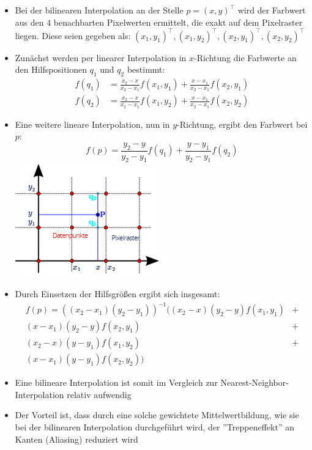 \documentclass{scrartcl}
\begin{document}
\begin{itemize}
	\item Bei der bilinearen Interpolation an der Stelle $p = (x,y)^\top$ wird der Farbwert aus den 4 benachbarten Pixelwerten ermittelt, die exakt auf dem Pixelraster liegen. Diese seien gegeben als: $(x_1, y_1)^\top, (x_1, y_2)^\top, (x_2, y_1)^\top, (x_2, y_2)^\top$
	\item Zunächst werden per linearer Interpolation in $x$-Richtung die Farbwerte an den Hilfspositionen $q_1$ und $q_2$ bestimmt:
	\begin{equation}
		\begin{split}
			f(q_1) &= \frac{x_2 - x}{x_2 - x_1} f(x_1,y_1) + \frac{x - x_1}{x_2 - x_1} f(x_2, y_1) \\
			f(q_2) &= \frac{x_2 - x}{x_2 - x_1} f(x_1, y_2) + \frac{x - x_1}{x_2 - x_1} f(x_2, y_2)
		\end{split}
	\end{equation}
	\item Eine weitere lineare Interpolation, nun in $y$-Richtung, ergibt den Farbwert bei $p$:
	\begin{equation}
		f(p) = \frac{y_2 - y}{y_2 - y_1} f(q_1) + \frac{y - y_1}{y_2 - y_1} f(q_2)
	\end{equation}
	\includegraphics[scale=1]{figures/bilinear_interpolation.png}
	\item Durch Einsetzen der Hilfsgrößen ergibt sich insgesamt:
	\begin{equation}
		\begin{split}
			f(p) = ((x_2 - x_1)(y_2 - y_1))^{-1} ((x_2 - x)(y_2 - y) f(x_1, y_1) &+ \\
			(x - x_1)(y_2 - y) f(x_2, y_1) &+ \\
			(x_2 - x)(y - y_1) f(x_1, y_2) &+ \\
			(x - x_1)(y - y_1) f(x_2, y_2)) &
		\end{split}
	\end{equation}
	\item Eine bilineare Interpolation ist somit im Vergleich zur Nearest-Neighbor-Interpolation relativ aufwendig
	\item Der Vorteil ist, dass durch eine solche gewichtete Mittelwertbildung, wie sie bei der bilinearen Interpolation durchgeführt wird, der ''Treppeneffekt'' an Kanten (Aliasing) reduziert wird
\end{itemize}
\end{document}
